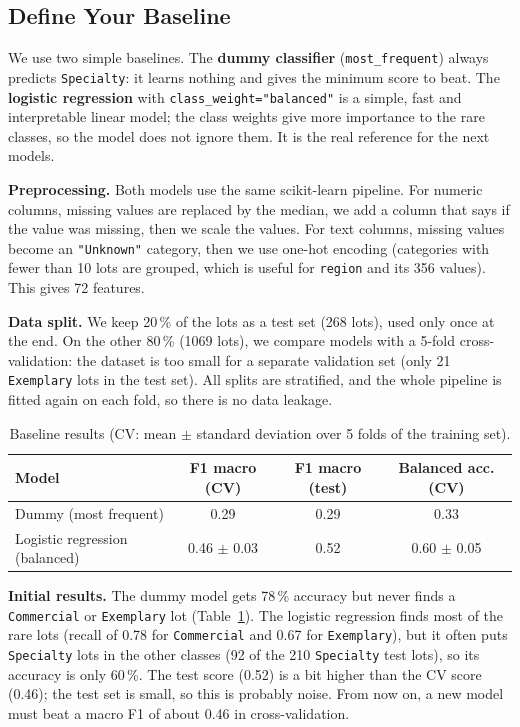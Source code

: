\documentclass{article}
\begin{document}
\subsection{Define Your Baseline}

We use two simple baselines. The \textbf{dummy classifier} (\texttt{most\_frequent}) always predicts \texttt{Specialty}: it learns nothing and gives the minimum score to beat. The \textbf{logistic regression} with \texttt{class\_weight="balanced"} is a simple, fast and interpretable linear model; the class weights give more importance to the rare classes, so the model does not ignore them. It is the real reference for the next models.

\textbf{Preprocessing.} Both models use the same scikit-learn pipeline. For numeric columns, missing values are replaced by the median, we add a column that says if the value was missing, then we scale the values. For text columns, missing values become an \texttt{"Unknown"} category, then we use one-hot encoding (categories with fewer than 10 lots are grouped, which is useful for \texttt{region} and its 356 values). This gives 72 features.

\textbf{Data split.} We keep 20\,\% of the lots as a test set (268 lots), used only once at the end. On the other 80\,\% (1069 lots), we compare models with a 5-fold cross-validation: the dataset is too small for a separate validation set (only 21 \texttt{Exemplary} lots in the test set). All splits are stratified, and the whole pipeline is fitted again on each fold, so there is no data leakage.

\begin{table}[h]
  \centering
  \small
  \caption{Baseline results (CV: mean $\pm$ standard deviation over 5 folds of the training set).}
  \label{tab:baseline}
  \begin{tabular}{lccc}
    \toprule
    Model & F1 macro (CV) & F1 macro (test) & Balanced acc. (CV) \\
    \midrule
    Dummy (most frequent) & 0.29 & 0.29 & 0.33 \\
    Logistic regression (balanced) & 0.46 $\pm$ 0.03 & 0.52 & 0.60 $\pm$ 0.05 \\
    \bottomrule
  \end{tabular}
\end{table}

\textbf{Initial results.} The dummy model gets 78\,\% accuracy but never finds a \texttt{Commercial} or \texttt{Exemplary} lot (Table~\ref{tab:baseline}). The logistic regression finds most of the rare lots (recall of 0.78 for \texttt{Commercial} and 0.67 for \texttt{Exemplary}), but it often puts \texttt{Specialty} lots in the other classes (92 of the 210 \texttt{Specialty} test lots), so its accuracy is only 60\,\%. The test score (0.52) is a bit higher than the CV score (0.46); the test set is small, so this is probably noise. From now on, a new model must beat a macro F1 of about 0.46 in cross-validation.
\end{document}
